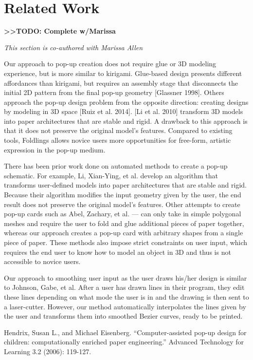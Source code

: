 \section{Related Work}\label{related-work}

\textbf{\textgreater{}\textgreater{}TODO: Complete w/Marissa}

\emph{This section is co-authored with Marissa Allen}

Our approach to pop-up creation does not require glue or 3D modeling
experience, but is more similar to kirigami. Glue-based design presents
different affordances than kirigami, but requires an assembly stage that
disconnects the initial 2D pattern from the final pop-up geometry
{[}Glassner 1998{]}. Others approach the pop-up design problem from the
opposite direction: creating designs by modeling in 3D space {[}Ruiz et
al. 2014{]}. {[}Li et al. 2010{]} transform 3D models into paper
architectures that are stable and rigid. A drawback to this approach is
that it does not preserve the original model's features. Compared to
existing tools, Foldlings allows novice users more opportunities for
free-form, artistic expression in the pop-up medium.

There has been prior work done on automated methods to create a pop-up
schematic. For example, Li, Xian-Ying, et al. develop an algorithm that
transforms user-defined models into paper architectures that are stable
and rigid. Because their algorithm modifies the input geometry given by
the user, the end result does not preserve the original model's
features. Other attempts to create pop-up cards such as Abel, Zachary,
et al. --- can only take in simple polygonal meshes and require the user
to fold and glue additional pieces of paper together, whereas our
approach creates a pop-up card with arbitrary shapes from a single piece
of paper. These methods also impose strict constraints on user input,
which requires the end user to know how to model an object in 3D and
thus is not accessible to novice users.

Our approach to smoothing user input as the user draws his/her design is
similar to Johnson, Gabe, et al. After a user has drawn lines in their
program, they edit these lines depending on what mode the user is in and
the drawing is then sent to a laser-cutter. However, our method
automatically interpolates the lines given by the user and transforms
them into smoothed Bezier curves, ready to be printed.

Hendrix, Susan L., and Michael Eisenberg. ``Computer-assisted pop-up
design for children: computationally enriched paper engineering.''
Advanced Technology for Learning 3.2 (2006): 119-127.
\citet{hendrix2006computer}

